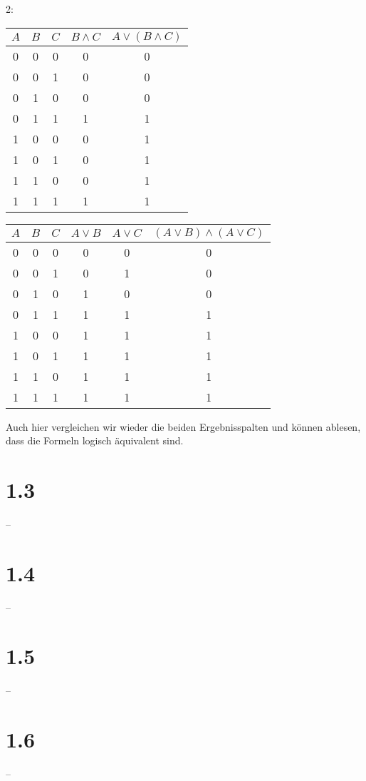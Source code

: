\documentclass[12pt]{article}
\begin{document}
\newpage

2:

\begin{tabular}{|c|c|c|c||c|}
\hline
$A$ & $B$   & $C$   & $B \wedge C$    & $A \vee (B \wedge C)$  \\
\hline
\hline
0   &  0    & 0     &   0           &   0\\
0   &  0    & 1     &   0           &   0\\
0   &  1    & 0     &   0           &   0\\
0   &  1    & 1     &   1           &   1\\
1   &  0    & 0     &   0           &   1\\
1   &  0    & 1     &   0           &   1\\
1   &  1    & 0     &   0           &   1\\
1   &  1    & 1     &   1           &   1\\
\hline

\end{tabular}




\begin{tabular}{|c|c|c|c|c||c|}
\hline
$A$ & $B$   & $C$   & $A \vee B$  & $A \vee C$  & $(A \vee B) \wedge (A \vee C)$  \\
\hline
\hline
0   &  0    & 0     &   0           &   0           & 0 \\
0   &  0    & 1     &   0           &   1           & 0 \\
0   &  1    & 0     &   1           &   0           & 0 \\
0   &  1    & 1     &   1           &   1           & 1 \\
1   &  0    & 0     &   1           &   1           & 1 \\
1   &  0    & 1     &   1           &   1           & 1 \\
1   &  1    & 0     &   1           &   1           & 1 \\
1   &  1    & 1     &   1           &   1           & 1 \\
\hline

\end{tabular}

Auch hier vergleichen wir wieder die beiden Ergebnisspalten und können ablesen, dass die
Formeln logisch äquivalent sind.

\section*{1.3}
--

\section*{1.4}
--

\section*{1.5}
--

\section*{1.6}
--
\end{document}
